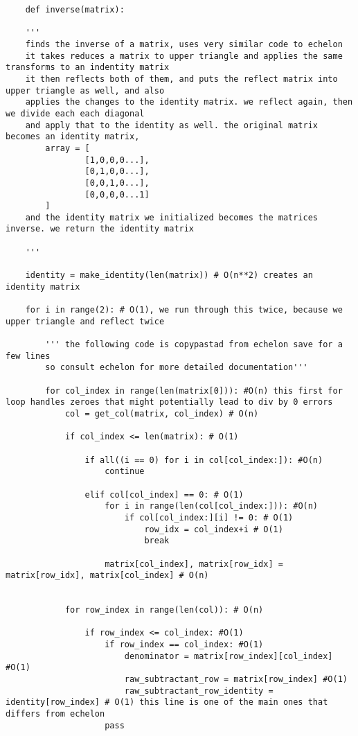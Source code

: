 \documentclass[12pt, a4paper]{article}
\begin{document}
\begin{lstlisting}
    def inverse(matrix): 

    '''
    finds the inverse of a matrix, uses very similar code to echelon
    it takes reduces a matrix to upper triangle and applies the same transforms to an indentity matrix
    it then reflects both of them, and puts the reflect matrix into upper triangle as well, and also
    applies the changes to the identity matrix. we reflect again, then we divide each each diagonal
    and apply that to the identity as well. the original matrix becomes an identity matrix,
        array = [
                [1,0,0,0...],
                [0,1,0,0...],
                [0,0,1,0...],
                [0,0,0,0...1]
        ]
    and the identity matrix we initialized becomes the matrices inverse. we return the identity matrix
    
    '''

    identity = make_identity(len(matrix)) # O(n**2) creates an identity matrix

    for i in range(2): # O(1), we run through this twice, because we upper triangle and reflect twice

        ''' the following code is copypastad from echelon save for a few lines
        so consult echelon for more detailed documentation'''
        
        for col_index in range(len(matrix[0])): #O(n) this first for loop handles zeroes that might potentially lead to div by 0 errors
            col = get_col(matrix, col_index) # O(n)

            if col_index <= len(matrix): # O(1)

                if all((i == 0) for i in col[col_index:]): #O(n)
                    continue 
                
                elif col[col_index] == 0: # O(1)
                    for i in range(len(col[col_index:])): #O(n)
                        if col[col_index:][i] != 0: # O(1)
                            row_idx = col_index+i # O(1)
                            break 
                    
                    matrix[col_index], matrix[row_idx] = matrix[row_idx], matrix[col_index] # O(n)


            for row_index in range(len(col)): # O(n)

                if row_index <= col_index: #O(1)
                    if row_index == col_index: #O(1)
                        denominator = matrix[row_index][col_index] #O(1)
                        raw_subtractant_row = matrix[row_index] #O(1)
                        raw_subtractant_row_identity = identity[row_index] # O(1) this line is one of the main ones that differs from echelon
                    pass              


\end{lstlisting}
\end{document}
